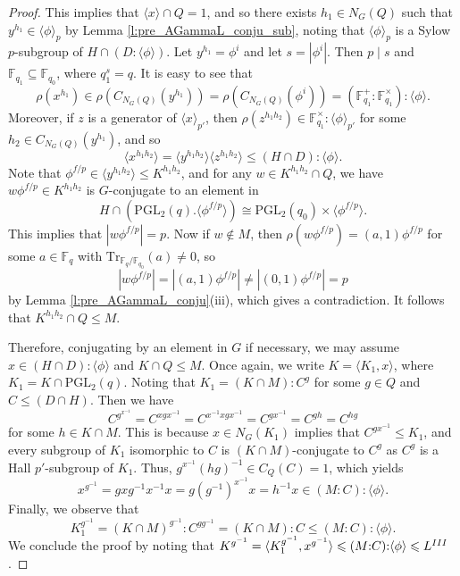 \documentclass[twoside,a4paper,reqno,11pt]{amsart}
\newcommand{\<}{\langle}
\renewcommand{\>}{\rangle}
\newcommand{\la}{\langle}
\newcommand{\ra}{\rangle}
\newcommand{\leqs}{\leqslant}
\newcommand{\PGL}{\mathrm{PGL}}
\newcommand{\Tr}{\mathrm{Tr}}
\theoremstyle{definition}
\begin{document}
\begin{proof}
		This implies that $\la x\ra\cap Q = 1$, and so there exists $h_1\in N_G(Q)$ such that $y^{h_1}\in\la\phi\ra_p$ by Lemma \ref{l:pre_AGammaL_conju_sub}, noting that $\la\phi\ra_p$ is a Sylow $p$-subgroup of $H\cap (D{:}\la\phi\ra)$. Let $y^{h_1} = \phi^i$ and let $s = |\phi^i|$. Then $p\mid s$ and $\mathbb{F}_{q_1}\subseteq\mathbb{F}_{q_0}$, where $q_1^s = q$.
		It is easy to see that
		\begin{equation*}
		\rho(x^{h_1})\in \rho(C_{N_G(Q)}(y^{h_1})) = \rho(C_{N_G(Q)}(\phi^i)) = (\mathbb{F}_{q_1}^+{:}\mathbb{F}_{q_1}^\times){:}\la \phi\ra.
		\end{equation*}
		Moreover, if $z$ is a generator of $\la x\ra_{p'}$, then $\rho(z^{h_1h_2})\in \mathbb{F}_{q_1}^\times{:}\la\phi\ra_{p'}$ for some $h_2\in C_{N_G(Q)}(y^{h_1})$, and so
		\begin{equation*}
		\la x^{h_1h_2}\ra = \la y^{h_1h_2}\ra\la z^{h_1h_2}\ra\leqs (H\cap D){:}\la\phi\ra.
		\end{equation*}
		Note that $\phi^{f/p}\in\la y^{h_1h_2}\ra\leqs K^{h_1h_2}$, and for any $w\in K^{h_1h_2}\cap Q$, we have $w\phi^{f/p}\in K^{h_1h_2}$ is $G$-conjugate to an element in
		\begin{equation*}
		H\cap (\PGL_2(q).\la\phi^{f/p}\ra)\cong \PGL_2(q_0)\times \la \phi^{f/p}\ra.
		\end{equation*}
		This implies that $|w\phi^{f/p}| = p$. Now if $w\notin M$, then $\rho(w\phi^{f/p}) = (a,1)\phi^{f/p}$ for some $a\in\mathbb{F}_q$ with $\Tr_{\mathbb{F}_q/\mathbb{F}_{q_0}}(a)\ne 0$, so
		\begin{equation*}
		|w\phi^{f/p}| = |(a,1)\phi^{f/p}| \ne |(0,1)\phi^{f/p}| = p
		\end{equation*}
		by Lemma \ref{l:pre_AGammaL_conju}(iii), which gives a contradiction. It follows that $K^{h_1h_2}\cap Q\leqs M$.
		
		Therefore, conjugating by an element in $G$ if necessary, we may assume $x\in (H\cap D){:}\la \phi\ra$ and $K\cap Q\leqs M$. Once again, we write $K = \la K_1,x\ra$, where $K_1 = K\cap \PGL_2(q)$. Noting that $K_1 = (K\cap M){:}C^g$ for some $g\in Q$ and $C\leqs (D\cap H)$. Then we have
		\begin{equation*}
		C^{g^{x^{-1}}} = C^{xgx^{-1}} = C^{x^{-1}xgx^{-1}} = C^{gx^{-1}} = C^{gh} = C^{hg}
		\end{equation*}
		for some $h\in K\cap M$. This is because $x\in N_G(K_1)$ implies that $C^{gx^{-1}}\leqs K_1$, and every subgroup of $K_1$ isomorphic to $C$ is $(K\cap M)$-conjugate to $C^g$ as $C^g$ is a Hall $p'$-subgroup of $K_1$. Thus, $g^{x^{-1}}(hg)^{-1}\in C_Q(C) = 1$, which yields
		\begin{equation*}
		x^{g^{-1}} = gxg^{-1}x^{-1}x = g(g^{-1})^{x^{-1}}x = h^{-1}x\in (M{:}C){:}\la\phi\ra.
		\end{equation*}
		Finally, we observe that
		\begin{equation*}
		K_1^{g^{-1}} = (K\cap M)^{g^{-1}}{:}C^{gg^{-1}} = (K\cap M){:}C\leqs (M{:}C){:}\la \phi\ra.
		\end{equation*}
		We conclude the proof by noting that $K^{g^{-1}} = \la K_1^{g^{-1}},x^{g^{-1}}\ra\leqs (M{:}C){:}\la\phi\ra\leqs L^{\rm III}$.
	\end{proof}
	
\end{document}
